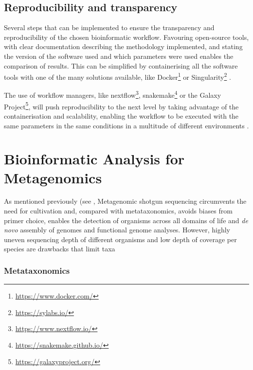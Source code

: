 \subsection{Reproducibility and transparency} \label{ssec:reproducibility}

Several steps that can be implemented to ensure the transparency and reproducibility of the chosen bioinformatic workflow. 
Favouring open-source tools, with clear documentation describing the methodology implemented, and stating the version of the software used and which parameters were used enables the comparison of results. 
This can be simplified by containerising all the software tools with one of the many solutions available, like Docker\footnote{\url{https://www.docker.com/}} or Singularity\footnote{\url{https://sylabs.io/}} \citep{kurtzer_singularity_2017}. 

The use of workflow managers, like nextflow\footnote{\url{https://www.nextflow.io/}}, snakemake\footnote{\url{https://snakemake.github.io/}} or the Galaxy Project\footnote{\url{https://galaxyproject.org/}}, will push reproducibility to the next level by taking advantage of the containerisation and scalability, enabling the workflow to be executed with the same parameters in the same conditions in a multitude of different environments \citep{di_tommaso_nextflow_2017, molder_sustainable_2021, afgan_galaxy_2018}. 


\section{Bioinformatic Analysis for Metagenomics} \label{sec:metagenomics_bioinfo}

As mentioned previously (see , Metagenomic shotgun sequencing circumvents the need for cultivation and, compared with metataxonomics, avoids biases from primer choice, enables the detection of organisms across all domains of life and \textit{de novo} assembly of genomes and functional genome analyses. However, highly uneven sequencing depth of different organisms and low depth of coverage per species are drawbacks that limit taxa

\subsubsection{Metataxonomics} \label{ssec:metataxonomics_bioinfo}

